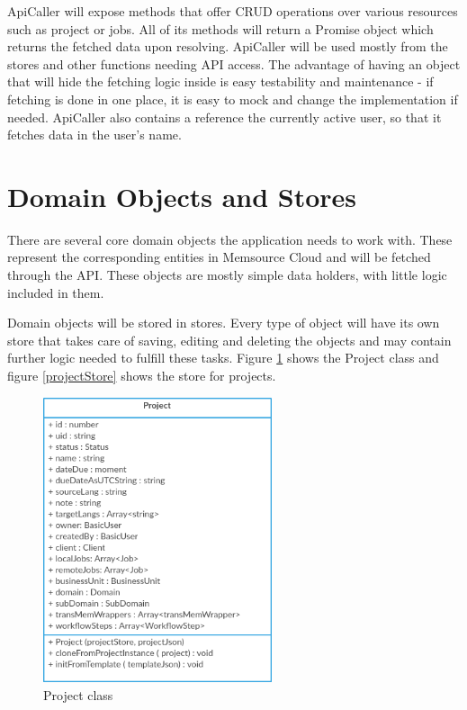 ApiCaller will expose methods that offer CRUD operations over various resources such as project or jobs. All of its methods will return a Promise object which returns the fetched data upon resolving. ApiCaller will be used mostly from the stores and other functions needing API access. The advantage of having an object that will hide the fetching logic inside is easy testability and maintenance - if fetching is done in one place, it is easy to mock and change the implementation if needed. ApiCaller also contains a reference the currently active user, so that it fetches data in the user's name.


\section{Domain Objects and Stores}\label{sec:stores}

There are several core domain objects the application needs to work with. These represent the corresponding entities in Memsource Cloud and will be fetched through the API. These objects are mostly simple data holders, with little logic included in them. 

Domain objects will be stored in stores. Every type of object will have its own store that takes care of saving, editing and deleting the objects and may contain further logic needed to fulfill these tasks.
Figure \ref{Project} shows the Project class and figure \ref{projectStore} shows the store for projects. 

\begin{figure}[H]
	\includegraphics[width=0.6\textwidth]{pics/Project}
	\caption{Project class}
	\label{Project}
\end{figure}


